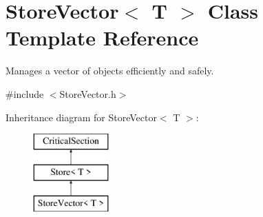 \hypertarget{class_store_vector}{
\section{StoreVector$<$ T $>$ Class Template Reference}
\label{class_store_vector}
}


Manages a vector of objects efficiently and safely.  




{\ttfamily \#include $<$StoreVector.h$>$}

Inheritance diagram for StoreVector$<$ T $>$:\begin{figure}[H]
\begin{center}
\leavevmode
\includegraphics[height=3.000000cm]{class_store_vector}
\end{center}
\end{figure}
